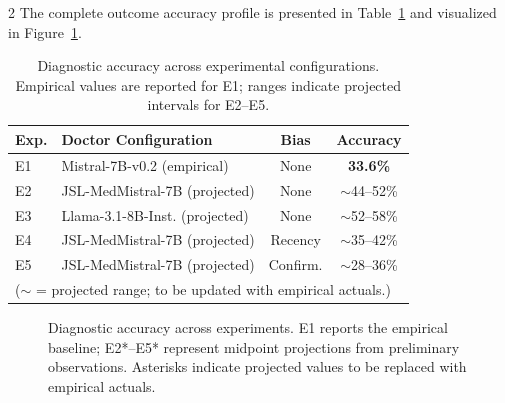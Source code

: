 \documentclass[10pt, a4paper]{article}
\begin{document}
\begin{multicols}{2}
The complete outcome accuracy profile is presented in Table~\ref{tab:results_accuracy} and visualized in Figure~\ref{fig:accuracy_comparison}.

\begin{table}[H]
\centering
\caption{Diagnostic accuracy across experimental configurations. Empirical values are reported for E1; ranges indicate projected intervals for E2–E5.}
\label{tab:results_accuracy}
\scriptsize
\begin{tabular}{@{}llcc@{}}
\toprule
\textbf{Exp.} & \textbf{Doctor Configuration} & \textbf{Bias} & \textbf{Accuracy} \\
\midrule
E1 & Mistral-7B-v0.2 (empirical) & None       & \textbf{33.6\%} \\
E2 & JSL-MedMistral-7B (projected) & None     & $\sim$44–52\% \\
E3 & Llama-3.1-8B-Inst. (projected) & None    & $\sim$52–58\% \\
E4 & JSL-MedMistral-7B (projected) & Recency  & $\sim$35–42\% \\
E5 & JSL-MedMistral-7B (projected) & Confirm. & $\sim$28–36\% \\
\bottomrule
\multicolumn{4}{l}{\scriptsize ($\sim$ = projected range; to be updated with empirical actuals.)} \\
\end{tabular}
\end{table}

\begin{figure}[H]
\centering
{}
\caption{Diagnostic accuracy across experiments. E1 reports the empirical baseline; E2*–E5* represent midpoint projections from preliminary observations. Asterisks indicate projected values to be replaced with empirical actuals.}
\label{fig:accuracy_comparison}
\end{figure}


\end{multicols}
\end{document}
